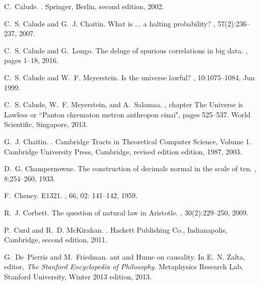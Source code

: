 \documentclass[12pt]{article}
\begin{document}
\begin{thebibliography}{10}
C.~Calude.
.
\newblock Springer, Berlin, second edition, 2002.

C.~S. Calude and G.~J. Chaitin.
\newblock What is $\ldots$ a halting probability?
, 57(2):236--237, 2007.

C.~S. Calude and G.~Longo.
\newblock The deluge of spurious correlations in big data.
, pages 1--18, 2016.

C.~S. Calude and W.~F. Meyerstein.
\newblock Is the universe lawful?
, 10:1075--1084, Jun 1999.

C.~S. Calude, W.~F. Meyerstein, and A.~Salomaa.
, chapter The Universe is Lawless or ``Panton chrematon metron
  anthropon einai", pages 525--537.
\newblock World Scientific, Singapore, 2013.

G.~J. Chaitin.
.
\newblock Cambridge Tracts in Theoretical Computer Science, Volume 1. Cambridge
  University Press, Cambridge, revised edition edition, 1987,  2003.

D.~G. Champernowne.
\newblock The construction of decimals normal in the scale of ten.
, 8:254--260, 1933.

F.~Cheney.
\newblock E1321.
, 66, 02: 141--142, 1959.

R.~J. Corbett.
\newblock The question of natural law in {Aristotle.}
, 30(2):229--250, 2009.

P.~Curd and R.~D. McKirahan.
.
\newblock Hackett Publishing Co., Indianapolis, Cambridge, second edition,
  2011.

G.~De~Pierris and M.~Friedman.
ant and {H}ume on causality.
\newblock In E.~N. Zalta, editor, {\em The {S}tanford Encyclopedia of
  Philosophy}. Metaphysics Research Lab, Stanford University, Winter 2013
  edition, 2013.


\end{thebibliography}
\end{document}
